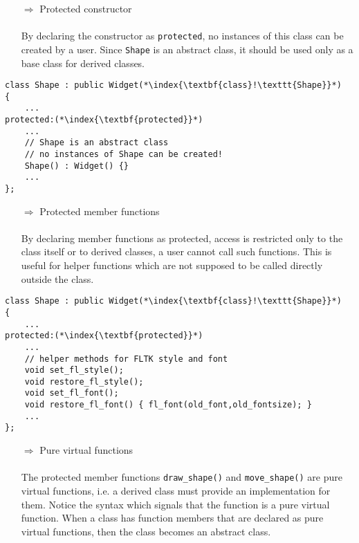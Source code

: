 \documentclass[10pt]{article}
\begin{document}
\begin{enumerate}
\item[$\Rightarrow$] Protected constructor\\ \\ By declaring the constructor as \texttt{protected}, no instances of this class can be created by a user. Since \texttt{Shape} is an abstract class, it should be used only as a base class for derived classes.
\end{enumerate}
\begin{lstlisting}
class Shape : public Widget(*\index{\textbf{class}!\texttt{Shape}}*)
{
    ...
protected:(*\index{\textbf{protected}}*)
    ...
    // Shape is an abstract class
    // no instances of Shape can be created!
    Shape() : Widget() {}
    ...
};
\end{lstlisting}
\begin{enumerate}
\item[$\Rightarrow$] Protected member functions\\ \\ By declaring member functions as protected, access is restricted only to the class itself or to derived classes, a user cannot call such functions. This is useful for helper functions which are not supposed to be called directly outside the class.
\end{enumerate}
\begin{lstlisting}
class Shape : public Widget(*\index{\textbf{class}!\texttt{Shape}}*)
{
    ...
protected:(*\index{\textbf{protected}}*)
    ...
    // helper methods for FLTK style and font
    void set_fl_style();
    void restore_fl_style();
    void set_fl_font();
    void restore_fl_font() { fl_font(old_font,old_fontsize); }
    ...
};
\end{lstlisting}
\begin{enumerate}
\item[$\Rightarrow$] Pure virtual functions\\ \\ The protected member functions \texttt{draw\_shape()} and \texttt{move\_shape()} are pure virtual functions, i.e. a derived class must provide an implementation for them. Notice the syntax  which signals that the function is a pure virtual function. When a class has function members that are declared as pure virtual functions, then the class becomes an abstract class.
\end{enumerate}
\end{document}
